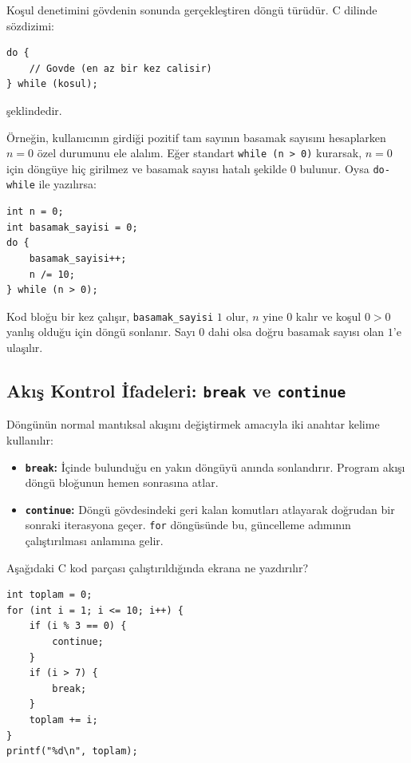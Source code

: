 \begin{definition}
Koşul denetimini gövdenin sonunda gerçekleştiren döngü türüdür. C dilinde sözdizimi:
\begin{lstlisting}[language=CTemel]
do {
    // Govde (en az bir kez calisir)
} while (kosul);
\end{lstlisting}
şeklindedir.
\end{definition}

Örneğin, kullanıcının girdiği pozitif tam sayının basamak sayısını hesaplarken $n = 0$ özel durumunu ele alalım. Eğer standart \texttt{while (n > 0)} kurarsak, $n = 0$ için döngüye hiç girilmez ve basamak sayısı hatalı şekilde $0$ bulunur. Oysa \texttt{do-while} ile yazılırsa:

\begin{lstlisting}[language=CTemel]
int n = 0;
int basamak_sayisi = 0;
do {
    basamak_sayisi++;
    n /= 10;
} while (n > 0);
\end{lstlisting}
Kod bloğu bir kez çalışır, \texttt{basamak\_sayisi} $1$ olur, $n$ yine $0$ kalır ve koşul $0 > 0$ yanlış olduğu için döngü sonlanır. Sayı $0$ dahi olsa doğru basamak sayısı olan $1$'e ulaşılır.

\subsection{Akış Kontrol İfadeleri: \texttt{break} ve \texttt{continue}}

Döngünün normal mantıksal akışını değiştirmek amacıyla iki anahtar kelime kullanılır:

\begin{itemize}
    \item \textbf{\texttt{break}:} İçinde bulunduğu en yakın döngüyü anında sonlandırır. Program akışı döngü bloğunun hemen sonrasına atlar.
    \item \textbf{\texttt{continue}:} Döngü gövdesindeki geri kalan komutları atlayarak doğrudan bir sonraki iterasyona geçer. \texttt{for} döngüsünde bu, güncelleme adımının çalıştırılması anlamına gelir.
\end{itemize}

\begin{example}
Aşağıdaki C kod parçası çalıştırıldığında ekrana ne yazdırılır?
\begin{lstlisting}[language=CTemel]
int toplam = 0;
for (int i = 1; i <= 10; i++) {
    if (i % 3 == 0) {
        continue;
    }
    if (i > 7) {
        break;
    }
    toplam += i;
}
printf("%d\n", toplam);
\end{lstlisting}
\end{example}

